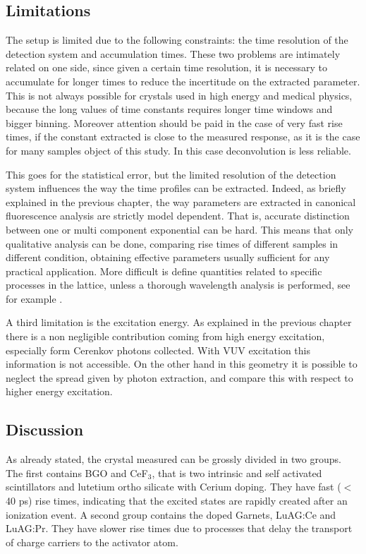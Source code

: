 \subsection{Limitations}

The setup is limited due to the following constraints: the time resolution of the detection system and accumulation times. 
These two problems are intimately related on one side, since given a certain time resolution, it is necessary to accumulate for longer times to reduce the incertitude on the extracted parameter. This is not always possible for crystals used in high energy and medical physics, because the long values of time constants requires longer time windows and bigger binning.
Moreover attention should be paid in the case of very fast rise times, if the constant extracted is close to the measured response, as it is the case for many samples object of this study. In this case deconvolution is less reliable.

This goes for the statistical error, but the limited resolution of the detection system influences the way the time profiles can be extracted. 
Indeed, as briefly explained in the previous chapter, the way parameters are extracted in canonical fluorescence analysis are strictly model dependent. That is, accurate distinction between one or multi component exponential can be hard.
This means that only qualitative analysis can be done, comparing rise times of different samples in different condition, obtaining effective parameters usually sufficient for any practical application.
More difficult is define quantities related to specific processes in the lattice, unless a thorough wavelength analysis is performed, see for example \cite{Belsky2013}.

A third limitation is the excitation energy. As explained in the previous chapter there is a non negligible contribution coming from high energy excitation, especially form Cerenkov photons collected. With VUV excitation this information is not accessible. On the other hand in this geometry it is possible to neglect the spread given by photon extraction, and compare this with respect to higher energy excitation. 

\subsection{Discussion}
As already stated, the crystal measured can be grossly divided in two groups.
The first contains BGO and CeF$_{3}$, that is two intrinsic and self activated scintillators and lutetium ortho silicate with Cerium doping. They have fast ($<$40 ps) rise times, indicating that the excited states are rapidly created after an ionization event.
A second group contains the doped Garnets, LuAG:Ce and LuAG:Pr. They have slower rise times due to processes that delay the transport of charge carriers to the activator atom.

